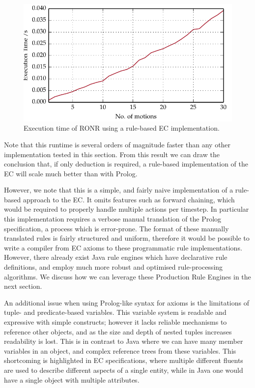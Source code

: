 \begin{figure}
\centering
\includegraphics{gfx/ec/rulebased}
\caption{Execution time of RONR using a rule-based EC implementation.}\label{fig:rulec}
\end{figure}


Note that this runtime is several orders of magnitude faster than any other
implementation tested in this section. From this result we can draw the
conclusion that, if only deduction is required, a rule-based implementation of
the \ac{EC} will scale much better than with Prolog.

However, we note that this is a simple, and fairly naive implementation of a
rule-based approach to the \ac{EC}. It omits features such as forward chaining,
which would be required to properly handle multiple actions per timestep. In
particular this implementation requires a verbose manual translation of the Prolog
specification, a process which is error-prone. The format of
these manually translated rules is fairly structured and uniform, therefore it would be
possible to write a compiler from \ac{EC} axioms to these programmatic rule
implementations. However, there already exist Java rule engines which have
declarative rule definitions, and employ much more robust and optimised 
rule-processing algorithms. We discuss how we can leverage these Production Rule
Engines in the next section.

An additional issue when using Prolog-like syntax for axioms is the
limitations of tuple- and predicate-based variables. This variable system is
readable and expressive with simple constructs; however it lacks reliable mechanisms to
reference other objects, and as the size and depth of nested tuples increases
readability is lost. This is in contrast to Java where we can have many member
variables in an object, and complex reference trees from these variables. This
shortcoming is highlighted in \ac{EC} specifications, where multiple different
fluents are used to describe different aspects of a single entity, while in
Java one would have a single object with multiple attributes.

